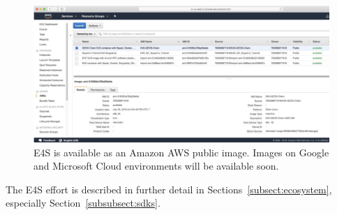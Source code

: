 \begin{figure}
	\centering
	\includegraphics[width=0.9\linewidth]{E4S-AWS-public-image}
	\caption{E4S is available as an Amazon AWS public image.  Images on Google and Microsoft Cloud environments will be available soon.}
	\label{fig:e4s-build-cache}
\end{figure}


The E4S effort is described in further detail in Sections~\ref{subsect:ecosystem}, especially Section~\ref{subsubsect:sdks}.

